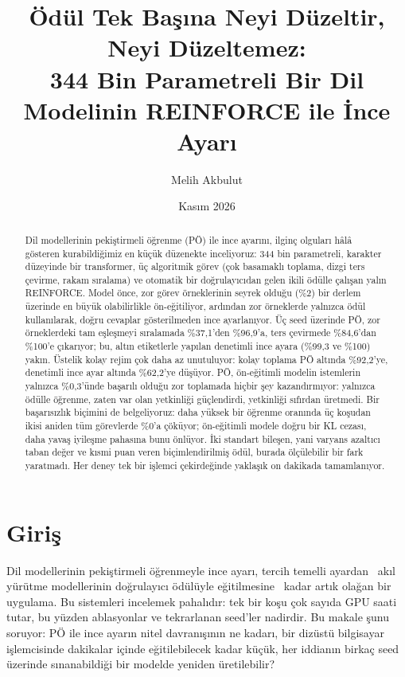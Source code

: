 \documentclass[10pt,twocolumn]{article}
\title{\textbf{Ödül Tek Başına Neyi Düzeltir, Neyi Düzeltemez:\\ 344 Bin Parametreli Bir Dil Modelinin
REINFORCE ile İnce Ayarı}}
\author{Melih Akbulut}
\date{Kasım 2026}
\begin{document}
\maketitle

\begin{abstract}
Dil modellerinin pekiştirmeli öğrenme (PÖ) ile ince ayarını, ilginç olguları hâlâ gösteren
kurabildiğimiz en küçük düzenekte inceliyoruz: 344 bin parametreli, karakter düzeyinde bir
transformer, üç algoritmik görev (çok basamaklı toplama, dizgi ters çevirme, rakam sıralama) ve
otomatik bir doğrulayıcıdan gelen ikili ödülle çalışan yalın REINFORCE. Model önce, zor görev
örneklerinin seyrek olduğu (\%2) bir derlem üzerinde en büyük olabilirlikle ön-eğitiliyor, ardından
zor örneklerde yalnızca ödül kullanılarak, doğru cevaplar gösterilmeden ince ayarlanıyor. Üç seed
üzerinde PÖ, zor örneklerdeki tam eşleşmeyi sıralamada \%37,1'den \%96,9'a, ters çevirmede
\%84,6'dan \%100'e çıkarıyor; bu, altın etiketlerle yapılan denetimli ince ayara (\%99,3 ve \%100)
yakın. Üstelik kolay rejim çok daha az unutuluyor: kolay toplama PÖ altında \%92,2'ye, denetimli
ince ayar altında \%62,2'ye düşüyor. PÖ, ön-eğitimli modelin istemlerin yalnızca \%0,3'ünde başarılı
olduğu zor toplamada hiçbir şey kazandırmıyor: yalnızca ödülle öğrenme, zaten var olan yetkinliği
güçlendirdi, yetkinliği sıfırdan üretmedi. Bir başarısızlık biçimini de belgeliyoruz: daha yüksek
bir öğrenme oranında üç koşudan ikisi aniden tüm görevlerde \%0'a çöküyor; ön-eğitimli modele doğru
bir KL cezası, daha yavaş iyileşme pahasına bunu önlüyor. İki standart bileşen, yani varyans azaltıcı
taban değer ve kısmi puan veren biçimlendirilmiş ödül, burada ölçülebilir bir fark yaratmadı. Her
deney tek bir işlemci çekirdeğinde yaklaşık on dakikada tamamlanıyor.
\end{abstract}

\section{Giriş}
Dil modellerinin pekiştirmeli öğrenmeyle ince ayarı, tercih temelli ayardan~\cite{ouyang2022}
akıl yürütme modellerinin doğrulayıcı ödülüyle eğitilmesine~\cite{shao2024,guo2025} kadar artık
olağan bir uygulama. Bu sistemleri incelemek pahalıdır: tek bir koşu çok sayıda GPU saati tutar,
bu yüzden ablasyonlar ve tekrarlanan seed'ler nadirdir. Bu makale şunu soruyor: PÖ ile ince ayarın
nitel davranışının ne kadarı, bir dizüstü bilgisayar işlemcisinde dakikalar içinde eğitilebilecek
kadar küçük, her iddianın birkaç seed üzerinde sınanabildiği bir modelde yeniden üretilebilir?
\end{document}
